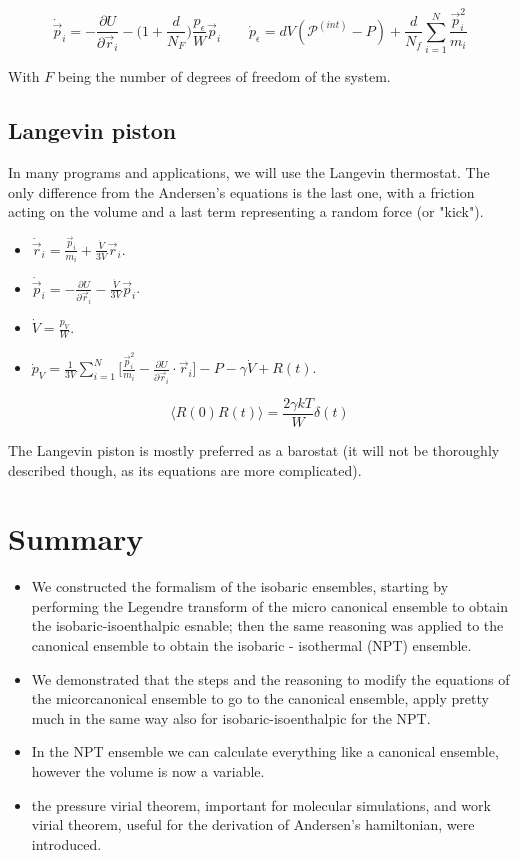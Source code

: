 $$\dot{\vec{p}}_i = -\frac{\partial U}{\partial\vec{r}_i} - \biggl(1+\frac{d}{N_F}\biggr)\frac{p_\epsilon}{W}\vec{p}_i\qquad \dot{p}_\epsilon = dV(\mathcal{P}^{(int)}-P) + \frac{d}{N_f}\sum\limits_{i=1}^N\frac{\vec{p}_i^2}{m_i}$$

With $F$ being the number of degrees of freedom of the system. 

	\subsection{Langevin piston}
	In many programs and applications, we will use the Langevin thermostat. 
	The only difference from the Andersen's equations is the last one, with a friction acting on the volume and a last term representing a random force (or "kick"). 

	\begin{itemize}
		\item $\dot{\vec{r}}_i = \frac{\vec{p}_i}{m_i} + \frac{\dot{V}}{3V}\vec{r}_i$.
		\item $\dot{\vec{p}}_i = -\frac{\partial U}{\partial\vec{r}_i}-\frac{\dot{V}}{3V}\vec{p}_i$.
		\item $\dot{V} = \frac{p_V}{W}$.
		\item $\dot{p}_V = \frac{1}{3V}\sum\limits_{i=1}^N\biggl[\frac{\vec{p}_i^2}{m_i}-\frac{\partial U}{\partial\vec{r}_i}\cdot\vec{r}_i\biggr]-P-\gamma\dot{V}+R(t)$.
	\end{itemize}

	$$\langle R(0)R(t)\rangle = \frac{2\gamma kT}{W}\delta(t)$$
	
	The Langevin piston is mostly preferred as a barostat (it will not be thoroughly described though, as its equations are more complicated).
	
\section{Summary}
\begin{itemize}
\item We constructed the formalism of the isobaric ensembles, starting by performing the Legendre transform of the micro canonical ensemble to obtain the isobaric-isoenthalpic esnable; then the same reasoning was applied to the canonical ensemble to obtain the isobaric - isothermal (NPT) ensemble.
\item We demonstrated that the steps and the reasoning to modify the equations of the micorcanonical ensemble to go to the canonical ensemble, apply pretty much in the same way also for isobaric-isoenthalpic for the NPT. 
\item In the NPT ensemble we can calculate everything like a canonical ensemble, however the volume is now a variable. 
\item the pressure virial theorem, important for molecular simulations, and work virial theorem, useful for the derivation of Andersen's hamiltonian, were introduced. 
\end{itemize}
